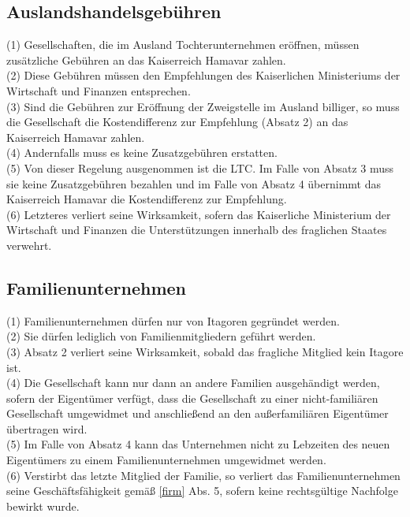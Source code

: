 \documentclass{article}
\begin{document}
\subsection{Auslandshandelsgebühren}
(1) Gesellschaften, die im Ausland Tochterunternehmen eröffnen, müssen zusätzliche Gebühren an das Kaiserreich Hamavar zahlen.\\
(2) Diese Gebühren müssen den Empfehlungen des Kaiserlichen Ministeriums der Wirtschaft und Finanzen entsprechen.\\ 
(3) Sind die Gebühren zur Eröffnung der Zweigstelle im Ausland billiger, so muss die Gesellschaft die Kostendifferenz zur Empfehlung (Absatz 2) an das Kaiserreich Hamavar zahlen.\\
(4) Andernfalls muss es keine Zusatzgebühren erstatten.\\
(5) Von dieser Regelung ausgenommen ist die LTC. Im Falle von Absatz 3 muss sie keine Zusatzgebühren bezahlen und im Falle von Absatz 4 übernimmt das Kaiserreich Hamavar die Kostendifferenz zur Empfehlung.\\
(6) Letzteres verliert seine Wirksamkeit, sofern das Kaiserliche Ministerium der Wirtschaft und Finanzen die Unterstützungen innerhalb des fraglichen Staates verwehrt.

\subsection{Familienunternehmen}\label{familien}
(1) Familienunternehmen dürfen nur von Itagoren gegründet werden.\\
(2) Sie dürfen lediglich von Familienmitgliedern geführt werden.\\
(3) Absatz 2 verliert seine Wirksamkeit, sobald das fragliche Mitglied kein Itagore ist.\\
(4) Die Gesellschaft kann nur dann an andere Familien ausgehändigt werden, sofern der Eigentümer verfügt, dass die Gesellschaft zu einer nicht-familiären Gesellschaft umgewidmet und anschließend an den außerfamiliären Eigentümer übertragen wird.\\
(5) Im Falle von Absatz 4 kann das Unternehmen nicht zu Lebzeiten des neuen Eigentümers zu einem Familienunternehmen umgewidmet werden.\\
(6) Verstirbt das letzte Mitglied der Familie, so verliert das Familienunternehmen seine Geschäftsfähigkeit gemäß \ref{firm} Abs. 5, sofern keine rechtsgültige Nachfolge bewirkt wurde.
\end{document}
